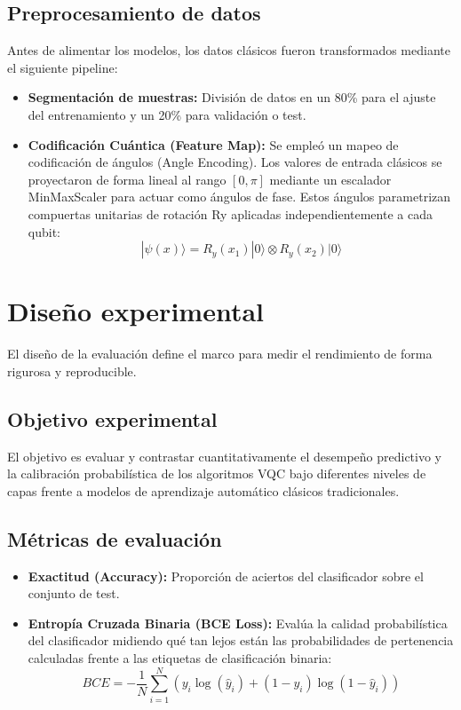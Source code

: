 \documentclass[12pt,oneside]{report}
\begin{document}
\subsection{Preprocesamiento de datos}
Antes de alimentar los modelos, los datos clásicos fueron transformados mediante el siguiente pipeline:
\begin{itemize}
    \item \textbf{Segmentación de muestras:} División de datos en un 80\% para el ajuste del entrenamiento y un 20\% para validación o test.
    \item \textbf{Codificación Cuántica (Feature Map):} Se empleó un mapeo de codificación de ángulos (Angle Encoding). Los valores de entrada clásicos se proyectaron de forma lineal al rango $[0, \pi]$ mediante un escalador MinMaxScaler para actuar como ángulos de fase. Estos ángulos parametrizan compuertas unitarias de rotación Ry aplicadas independientemente a cada qubit:
    \begin{equation}
        |\psi(x)\rangle = R_y(x_1)|0\rangle \otimes R_y(x_2)|0\rangle
    \end{equation}
\end{itemize}

\section{Diseño experimental}
El diseño de la evaluación define el marco para medir el rendimiento de forma rigurosa y reproducible.

\subsection{Objetivo experimental}
El objetivo es evaluar y contrastar cuantitativamente el desempeño predictivo y la calibración probabilística de los algoritmos VQC bajo diferentes niveles de capas frente a modelos de aprendizaje automático clásicos tradicionales.

\subsection{Métricas de evaluación}
\begin{itemize}
    \item \textbf{Exactitud (Accuracy):} Proporción de aciertos del clasificador sobre el conjunto de test.
    \item \textbf{Entropía Cruzada Binaria (BCE Loss):} Evalúa la calidad probabilística del clasificador midiendo qué tan lejos están las probabilidades de pertenencia calculadas frente a las etiquetas de clasificación binaria:
    \begin{equation}
        BCE = -\frac{1}{N}\sum_{i=1}^N \left( y_i \log(\hat{y}_i) + (1-y_i)\log(1-\hat{y}_i) \right)
    \end{equation}
\end{itemize}
\end{document}
